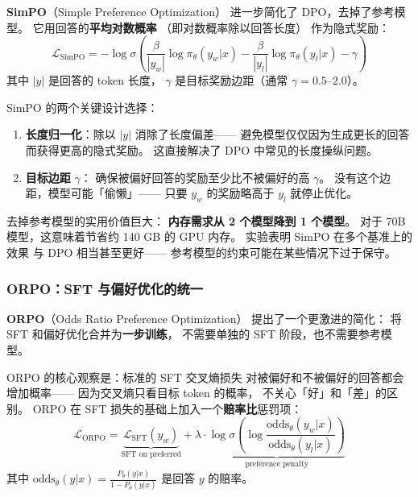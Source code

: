 
\textbf{SimPO}（Simple Preference Optimization）
进一步简化了 DPO，去掉了参考模型。
它用回答的\textbf{平均对数概率}
（即对数概率除以回答长度）
作为隐式奖励：
\begin{equation}
  \mathcal{L}_{\text{SimPO}} = -\log \sigma\!\left(
    \frac{\beta}{|y_w|} \log \pi_\theta(y_w|x)
    - \frac{\beta}{|y_l|} \log \pi_\theta(y_l|x) - \gamma
  \right)
  \label{eq:simpo}
\end{equation}
其中 $|y|$ 是回答的 token 长度，
$\gamma$ 是目标奖励边距（通常 $\gamma = 0.5$--$2.0$）。

SimPO 的两个关键设计选择：
\begin{enumerate}[noitemsep]
  \item \textbf{长度归一化}：除以 $|y|$ 消除了长度偏差——
        避免模型仅仅因为生成更长的回答而获得更高的隐式奖励。
        这直接解决了 DPO 中常见的长度操纵问题。
  \item \textbf{目标边距} $\gamma$：
        确保被偏好回答的奖励至少比不被偏好的高 $\gamma$。
        没有这个边距，模型可能「偷懒」——
        只要 $y_w$ 的奖励略高于 $y_l$ 就停止优化。
\end{enumerate}

去掉参考模型的实用价值巨大：
\textbf{内存需求从 2 个模型降到 1 个模型}。
对于 70B 模型，这意味着节省约 140 GB 的 GPU 内存。
实验表明 SimPO 在多个基准上的效果
与 DPO 相当甚至更好——
参考模型的约束可能在某些情况下过于保守。

\subsubsection{ORPO：SFT 与偏好优化的统一}


\textbf{ORPO}（Odds Ratio Preference Optimization）
提出了一个更激进的简化：
将 SFT 和偏好优化合并为\textbf{一步训练}，
不需要单独的 SFT 阶段，也不需要参考模型。

ORPO 的核心观察是：标准的 SFT 交叉熵损失
对被偏好和不被偏好的回答都会增加概率——
因为交叉熵只看目标 token 的概率，
不关心「好」和「差」的区别。
ORPO 在 SFT 损失的基础上加入一个\textbf{赔率比}惩罚项：
\begin{equation}
  \mathcal{L}_{\text{ORPO}} = \underbrace{
    \mathcal{L}_{\text{SFT}}(y_w)
  }_{\text{SFT on preferred}} + \lambda \cdot \underbrace{
    \log \sigma\!\left(
      \log \frac{\text{odds}_\theta(y_w|x)}{\text{odds}_\theta(y_l|x)}
    \right)
  }_{\text{preference penalty}}
  \label{eq:orpo}
\end{equation}
其中 $\text{odds}_\theta(y|x) = \frac{P_\theta(y|x)}{1 - P_\theta(y|x)}$
是回答 $y$ 的赔率。

